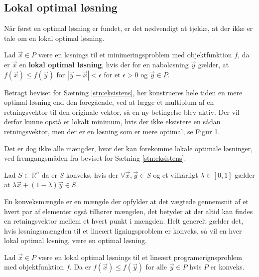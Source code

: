 \subsection{Lokal optimal løsning}
Når først en optimal løsning er fundet, er det nødvendigt at tjekke, at der ikke er tale om en lokal optimal løsning.
\begin{defn}
Lad $\vec{x} \in P$ være en løsnings til et minimeringsproblem med objektfunktion $f$, da er $\vec{x}$ en \textbf{lokal optimal løsning}, hvis der for en naboløsning $\vec{y}$ gælder, at $f(\vec{x}) \leq f(\vec{y})$ for $|\vec{y}-\vec{x}|< \epsilon$ for et $\epsilon > 0$ og $\vec{y} \in P$.
\end{defn}
Betragt beviset for Sætning \ref{stn:eksistens}, her konstrueres hele tiden en mere optimal løsning end den foregående, ved at lægge et multiplum af en retningsvektor til den originale vektor, så en ny betingelse blev aktiv.
Der vil derfor kunne opstå et lokalt minimum, hvis der ikke eksistere en sådan retningsvektor, men der er en løsning som er mere optimal, se Figur \ref{fig:lokaltmin}.
\begin{figure}
\begin{center}
	
	\label{fig:lokaltmin}
\end{center}
\end{figure}
Det er dog ikke alle mængder, hvor der kan forekomme lokale optimale løsninger, ved fremgangsmåden fra beviset for Sætning \ref{stn:eksistens}.
\begin{defn} 
Lad $S \subset \mathds{R}^n$  da er $S$ konveks, hvis der $\forall \vec{x}, \vec{y} \in S$ og et vilkårligt $\lambda \in [0,1]$ gælder at $\lambda \vec{x} + (1-\lambda) \vec{y} \in S$.
\label{def:Konveks}
\end{defn}
En konveksmængde er en mængde der opfylder at det vægtede gennemsnit af et hvert par af elementer også tilhører mængden, det betyder at der altid kan findes en retningsvektor mellem et hvert punkt i mængden.
Helt generelt gælder det, hvis løsningsmængden til et lineært ligningsproblem er konveks, så vil en hver lokal optimal løsning, være en optimal løsning.
\begin{stn}
Lad $\vec{x} \in P$ være en lokal optimal løsnings til et lineært programerignsproblem  med objektfunktion $f$.
Da er  $f(\vec{x}) \leq f(\vec{y})$ for alle $\vec{y} \in P$ hvis $P$ er konveks.
\end{stn}
